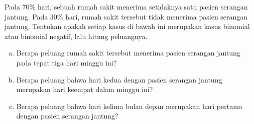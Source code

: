 \begin{exercisewrap}
\begin{nexercise}
Pada 70\% hari, sebuah rumah sakit menerima setidaknya satu pasien serangan jantung. Pada 30\% hari, rumah sakit tersebut tidak menerima pasien serangan jantung. Tentukan apakah setiap kasus di bawah ini merupakan kasus binomial atau binomial negatif, lalu hitung peluangnya.\footnotemark
\begin{enumerate}[(a)]
\setlength{\itemsep}{0mm}
\item Berapa peluang rumah sakit tersebut menerima
    pasien serangan jantung pada tepat tiga hari minggu ini?

\item Berapa peluang bahwa hari kedua dengan pasien
    serangan jantung merupakan hari keempat dalam minggu ini?

\item Berapa peluang bahwa hari kelima bulan depan
    merupakan hari pertama dengan pasien serangan jantung?
\end{enumerate}
\end{nexercise}
\end{exercisewrap}



{}





